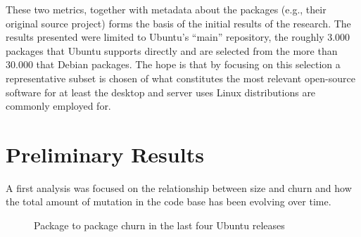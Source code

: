 \documentclass[11pt]{article}
\begin{document}
These two metrics, together with metadata about the packages (e.g., their original source project) forms the basis of the initial results of the research. The results presented were limited to Ubuntu's ``main'' repository, the roughly 3.000 packages that Ubuntu supports directly and are selected from the more than 30.000 that Debian packages. The hope is that by focusing on this selection a representative subset is chosen of what constitutes the most relevant open-source software for at least the desktop and server uses Linux distributions are commonly employed for.

\section{Preliminary Results}

A first analysis\cite{prelimresults} was focused on the relationship between size and churn and how the total amount of mutation in the code base has been evolving over time.

\begin{figure}[htb]
  \begin{center}
  \end{center}
  \caption{Package to package churn in the last four Ubuntu releases}
  \label{fig:churn}
\end{figure}
\end{document}
